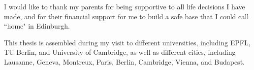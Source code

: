 \documentclass[phd,icsa,twoside,logo]{infthesis}
\begin{document}
\begin{preliminary}
\begin{acknowledgements}
I would like to thank my parents for being supportive to all life decisions I have made, and for their financial support for me to build a safe base that I could call ``home" in Edinburgh.

This thesis is assembled during my visit to different universities, including EPFL, TU Berlin, and University of Cambridge, as well as different cities, including Lausanne, Geneva, Montreux, Paris, Berlin, Cambridge, Vienna, and Budapest.


\end{acknowledgements}

\extendedstandarddeclaration


\tableofcontents


\end{preliminary}







% 

\appendix







\end{document}
